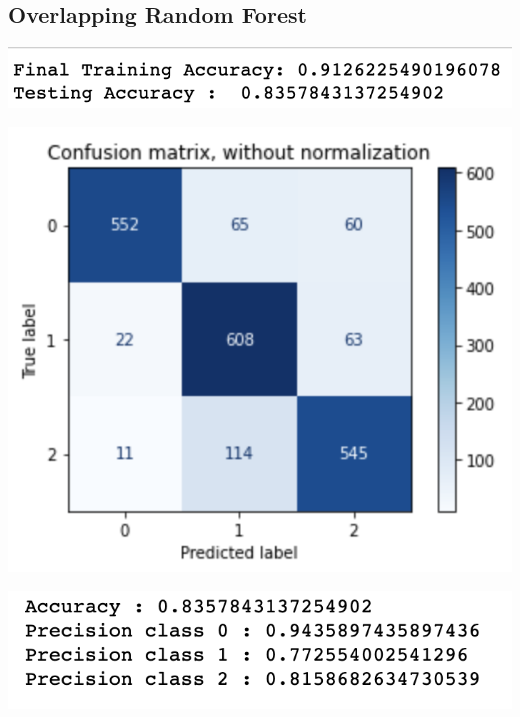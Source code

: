 \documentclass[12pt]{article}
\begin{document}
\begin{multicols*}{2}
  \subsection{Overlapping Random Forest} 
  \begin{center}
		\includegraphics[scale=0.5]{../screenshot/Rf-Overlapping012/score.png}

		\includegraphics[scale=0.5]{../screenshot/Rf-Overlapping012/cf.png}

		\includegraphics[scale=0.5]{../screenshot/Rf-Overlapping012/calc_result.png}
  \end{center}


\end{multicols*}

		

	
\end{document}
